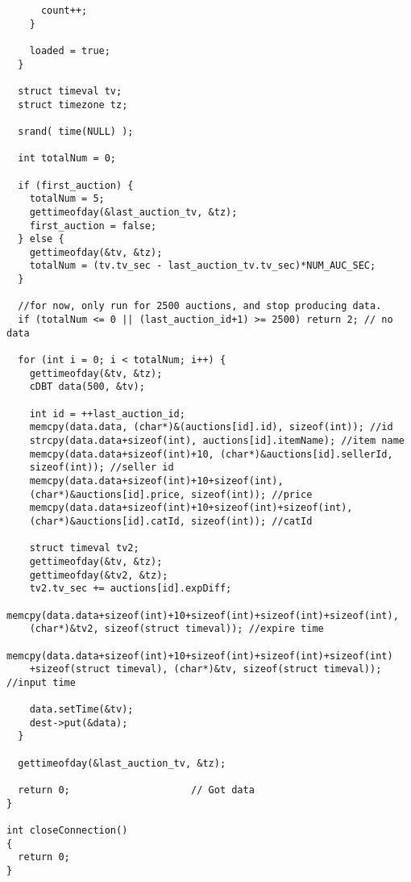 \documentclass[10pt]{article}
\begin{document}
\begin{verbatim}
      count++;      
    }
    
    loaded = true;
  }
  
  struct timeval tv;
  struct timezone tz;
  
  srand( time(NULL) );

  int totalNum = 0;
  
  if (first_auction) {
    totalNum = 5;
    gettimeofday(&last_auction_tv, &tz);
    first_auction = false;
  } else {
    gettimeofday(&tv, &tz);    
    totalNum = (tv.tv_sec - last_auction_tv.tv_sec)*NUM_AUC_SEC;
  }

  //for now, only run for 2500 auctions, and stop producing data.  
  if (totalNum <= 0 || (last_auction_id+1) >= 2500) return 2; // no data
  
  for (int i = 0; i < totalNum; i++) {
    gettimeofday(&tv, &tz);
    cDBT data(500, &tv);

    int id = ++last_auction_id;
    memcpy(data.data, (char*)&(auctions[id].id), sizeof(int)); //id
    strcpy(data.data+sizeof(int), auctions[id].itemName); //item name
    memcpy(data.data+sizeof(int)+10, (char*)&auctions[id].sellerId, 
	sizeof(int)); //seller id
    memcpy(data.data+sizeof(int)+10+sizeof(int), 
	(char*)&auctions[id].price, sizeof(int)); //price
    memcpy(data.data+sizeof(int)+10+sizeof(int)+sizeof(int), 
	(char*)&auctions[id].catId, sizeof(int)); //catId

    struct timeval tv2;
    gettimeofday(&tv, &tz);    
    gettimeofday(&tv2, &tz);
    tv2.tv_sec += auctions[id].expDiff;
    memcpy(data.data+sizeof(int)+10+sizeof(int)+sizeof(int)+sizeof(int), 
	(char*)&tv2, sizeof(struct timeval)); //expire time
    memcpy(data.data+sizeof(int)+10+sizeof(int)+sizeof(int)+sizeof(int)
	+sizeof(struct timeval), (char*)&tv, sizeof(struct timeval)); //input time
    
    data.setTime(&tv);
    dest->put(&data);
  }
  
  gettimeofday(&last_auction_tv, &tz);

  return 0;                     // Got data
}

int closeConnection()
{
  return 0;
}

\end{verbatim}


%
{\renewcommand{\baselinestretch}{1.01}
  \small
    
}
\end{document}
